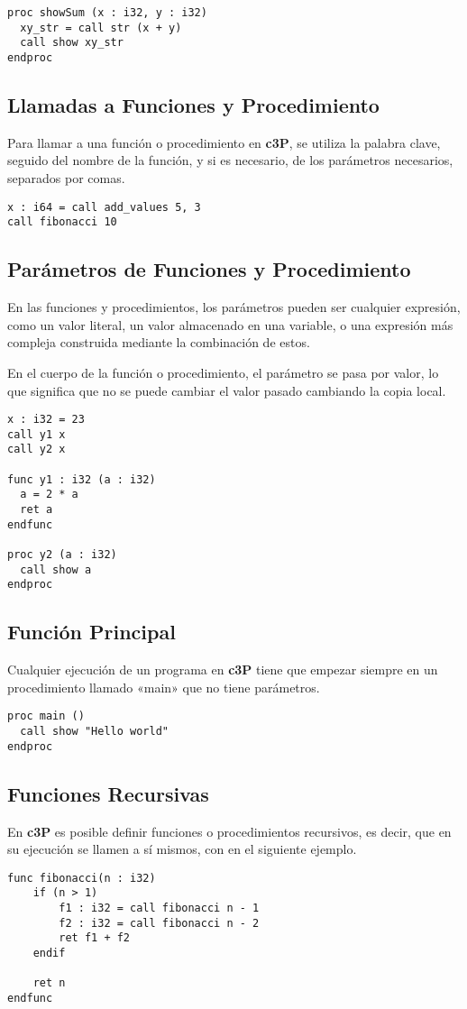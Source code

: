 \begin{verbatim}
proc showSum (x : i32, y : i32)
  xy_str = call str (x + y)
  call show xy_str
endproc
\end{verbatim}

\subsection{Llamadas a Funciones y Procedimiento}

Para llamar a una función o procedimiento en \textbf{c3P}, se utiliza la palabra clave,
seguido del nombre de la función, y si es necesario, de los parámetros necesarios, separados
por comas.

\begin{verbatim}
x : i64 = call add_values 5, 3
call fibonacci 10
\end{verbatim}

\subsection{Parámetros de Funciones y Procedimiento}

En las funciones y procedimientos, los parámetros pueden ser cualquier expresión, como
un valor literal, un valor almacenado en una variable, o una expresión más compleja
construida mediante la combinación de estos.

En el cuerpo de la función o procedimiento, el parámetro se pasa por valor, lo que
significa que no se puede cambiar el valor pasado cambiando la copia local.

\begin{verbatim}
x : i32 = 23
call y1 x
call y2 x

func y1 : i32 (a : i32)
  a = 2 * a
  ret a
endfunc

proc y2 (a : i32)
  call show a
endproc
\end{verbatim}

\subsection{Función Principal}

Cualquier ejecución de un programa en \textbf{c3P} tiene que empezar siempre en
un procedimiento llamado «main» que no tiene parámetros.

\begin{verbatim}
proc main ()
  call show "Hello world"
endproc
\end{verbatim}

\subsection{Funciones Recursivas}

En \textbf{c3P} es posible definir funciones o procedimientos recursivos,
es decir, que en su ejecución se llamen a sí mismos, con en el siguiente ejemplo.

\begin{verbatim}
func fibonacci(n : i32)
    if (n > 1)
        f1 : i32 = call fibonacci n - 1
        f2 : i32 = call fibonacci n - 2
        ret f1 + f2
    endif

    ret n
endfunc
\end{verbatim}
